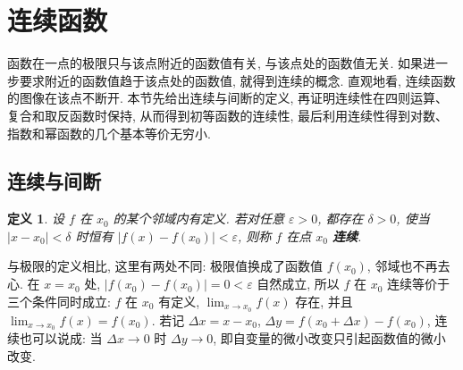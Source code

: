 \documentclass[UTF8,openany]{ctexbook}
\theoremstyle{chinesetextbook}
\newtheorem{definition}{定义}[section]
\begin{document}
\section{连续函数}
函数在一点的极限只与该点附近的函数值有关, 与该点处的函数值无关. 如果进一步要求附近的函数值趋于该点处的函数值, 就得到连续的概念. 直观地看, 连续函数的图像在该点不断开. 本节先给出连续与间断的定义, 再证明连续性在四则运算、复合和取反函数时保持, 从而得到初等函数的连续性, 最后利用连续性得到对数、指数和幂函数的几个基本等价无穷小.
\subsection{连续与间断}
\begin{definition}
设 $f$ 在 $x_0$ 的某个邻域内有定义. 若对任意 $\varepsilon>0$, 都存在 $\delta>0$, 使当 $|x-x_0|<\delta$ 时恒有 $|f(x)-f(x_0)|<\varepsilon$, 则称 $f$ 在点 $x_0$ \textbf{连续}.
\end{definition}
与极限的定义相比, 这里有两处不同: 极限值换成了函数值 $f(x_0)$, 邻域也不再去心. 在 $x=x_0$ 处, $|f(x_0)-f(x_0)|=0<\varepsilon$ 自然成立, 所以 $f$ 在 $x_0$ 连续等价于三个条件同时成立: $f$ 在 $x_0$ 有定义, $\displaystyle\lim_{x\to x_0}f(x)$ 存在, 并且 $\displaystyle\lim_{x\to x_0}f(x)=f(x_0)$. 若记 $\Delta x=x-x_0$, $\Delta y=f(x_0+\Delta x)-f(x_0)$, 连续也可以说成: 当 $\Delta x\to0$ 时 $\Delta y\to0$, 即自变量的微小改变只引起函数值的微小改变.
\end{document}
